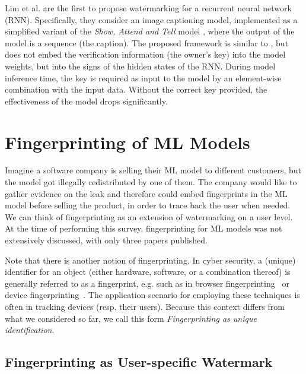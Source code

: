 Lim et al. \cite{lim_protect_2020} are the first to propose watermarking for a recurrent neural network (RNN). Specifically, they consider an image captioning model, implemented as a simplified variant of the \textit{Show, Attend and Tell} model \cite{xu_show_2015}, where the output of the model is a sequence (the caption). The proposed framework is similar to \cite{fan_rethinking_2019}, but does not embed the verification information (the owner's key) into the model weights, but into the signs of the hidden states of the RNN.
During model inference time, the key is required as input to the model by an element-wise combination with the input data.
Without the correct key provided, the effectiveness of the model drops significantly.

\section{Fingerprinting of ML Models} \label{sec:fingerprinting}

Imagine a software company is selling their ML model to different customers, but the model got illegally redistributed by one of them. The company would like to gather evidence on the leak and therefore could embed fingerprints in the ML model before selling the product, in order to trace back the user when needed. We can think of fingerprinting as an extension of watermarking on a user level.
%
At the time of performing this survey, fingerprinting for ML models was not extensively discussed, with only three papers %
published.

Note that there is another notion of fingerprinting. In cyber security, a (unique) identifier for an object (either hardware, software, or a combination thereof) is generally referred to as a fingerprint, e.g. such as in browser fingerprinting~\cite{eckersley_how_2010} or device fingerprinting~\cite{kohno_remote_2005}. The application scenario for employing these techniques is often in tracking devices (resp. their users). Because this context differs from what we considered so far, we call this form \textit{Fingerprinting as unique identification}.

\subsection{Fingerprinting as User-specific Watermark}
\label{sec:fingerprinting:user-specific-wm}


